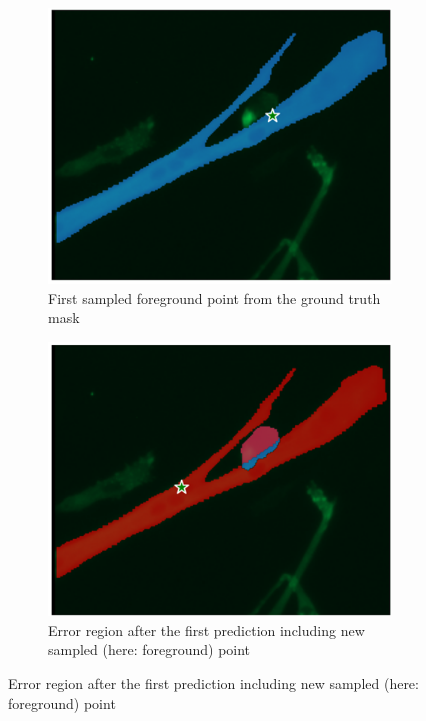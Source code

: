 \begin{figure}
	\centering
	\begin{subfigure}{0.45\textwidth}
		\centering
		\includegraphics[width=\linewidth]{images/training1}
		\caption{First sampled foreground point from the ground truth mask}
		\label{figtrain1}
	\end{subfigure}
	\hfill
	\begin{subfigure}{0.45\textwidth}
		\centering
		\includegraphics[width=\linewidth]{images/training2}
		\caption{Error region after the first prediction including new sampled (here: foreground) point}
		\label{figtrain2}
	\end{subfigure}
	

\end{figure}
